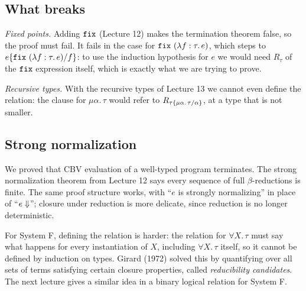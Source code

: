 \subsection{What breaks}
 
\emph{Fixed points.} Adding $\mathtt{fix}$ (Lecture 12) makes the termination theorem
false, so the proof must fail. It fails in the case for
$\mathtt{fix}\ (\lambda f : \tau.\, e)$, which steps to
$e\{\mathtt{fix}\ (\lambda f : \tau.\, e)/f\}$: to use the induction hypothesis for
$e$ we would need $R_\tau$ of the $\mathtt{fix}$ expression itself, which is exactly what
we are trying to prove.
 
\emph{Recursive types.} With the recursive types of Lecture 13 we cannot even define
the relation: the clause for $\mu\alpha.\, \tau$ would refer to
$R_{\tau\{\mu\alpha.\,\tau/\alpha\}}$, at a type that is not smaller.
 
\subsection{Strong normalization}
 
We proved that CBV evaluation of a well-typed program terminates. The strong
normalization theorem from Lecture 12 says every sequence of full $\beta$-reductions is
finite. The same proof structure works, with ``$e$ is strongly normalizing'' in place of
``$e \Downarrow$''; closure under reduction is more delicate, since reduction is no longer
deterministic.
 
For System F, defining the relation is harder: the relation for $\forall X.\, \tau$ must
say what happens for every instantiation of $X$, including $\forall X.\, \tau$ itself,
so it cannot be defined by induction on types. Girard (1972) solved this by quantifying
over all sets of terms satisfying certain closure properties, called \emph{reducibility
candidates}. The next lecture gives a similar idea in a binary logical relation for
System F.
% 
